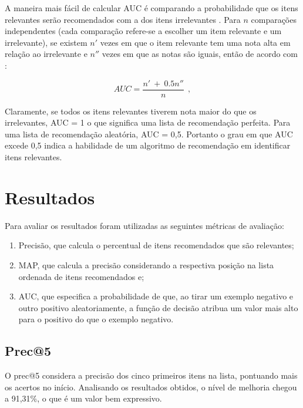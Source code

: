 A maneira mais fácil de calcular \ac{AUC} é comparando a probabilidade que os itens relevantes serão recomendados com a dos itens irrelevantes \citep{DBLP:journals/corr/abs-1202-1112}. Para $n$ comparações independentes (cada comparação refere-se a escolher um item relevante e um irrelevante), se existem $n'$ vezes em que o item relevante tem uma nota alta em relação ao irrelevante e $n''$ vezes em que as notas são iguais, então de acordo com \cite{zhou2009predicting}:

\begin{equation}
AUC = \frac{n'~+~0.5n''}{n}~~,
\end{equation}

Claramente, se todos os itens relevantes tiverem nota maior do que os irrelevantes, AUC = 1 o que significa uma lista de recomendação perfeita. Para uma lista de recomendação aleatória, AUC = 0,5. Portanto o grau em que AUC excede 0,5 indica a habilidade de um algoritmo de recomendação em identificar itens relevantes.







\section{Resultados}

Para avaliar os resultados foram utilizadas as seguintes métricas de avaliação:

\begin{enumerate}[label=(\alph*)]
	\item Precisão, que calcula	o percentual de itens recomendados que são relevantes;
	\item \ac{MAP}, que calcula a precisão considerando a respectiva posição na lista ordenada de itens recomendados e;
	\item \ac{AUC}, que especifica a probabilidade de que, ao tirar um exemplo negativo e outro positivo aleatoriamente, a função de decisão atribua um valor mais alto para o positivo do que o exemplo negativo.
\end{enumerate}

\subsection{Prec@5}

O prec@5 considera a precisão dos cinco primeiros itens na lista, pontuando mais os acertos no início. Analisando os resultados obtidos, o nível de melhoria chegou a 91,31\%, o que é um valor bem expressivo.

